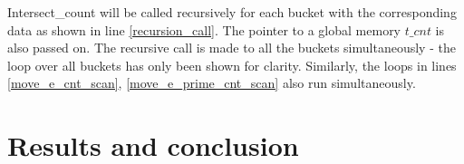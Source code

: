 \documentclass[conference]{IEEEtran}
\begin{document}
Intersect\_count will be called recursively for each bucket with the corresponding data as shown in line \ref{recursion_call}. The pointer to a global memory $t\_cnt$ is also passed on. The recursive call is made to all the buckets simultaneously - the loop over all buckets has only been shown for clarity. Similarly, the loops in lines \ref{move_e_cnt_scan}, \ref{move_e_prime_cnt_scan} also run simultaneously.



\section{Results and conclusion}
\end{document}
